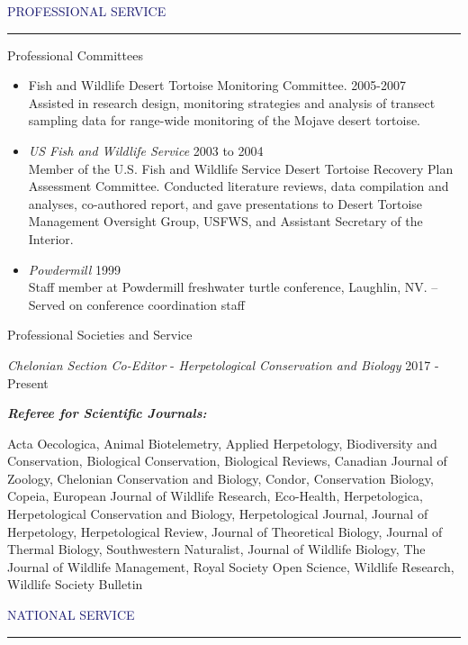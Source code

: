 \documentclass{resume} %
\renewenvironment{rSection}[1]{
\sectionskip
\textcolor{MidnightBlue}{\MakeUppercase{#1}}
\sectionlineskip
\hrule
\begin{list}{}{
\setlength{\leftmargin}{1.5em}
}
\item[]
}{
\end{list}
}
\begin{document}
\begin{rSection}{Professional Service}
\begin{rSubsection}{Professional Committees}{}{}{}
\begin{itemize}
\item Fish and Wildlife Desert Tortoise Monitoring Committee. \hfill 2005-2007\\
Assisted in research design, monitoring strategies and analysis of transect sampling data for range-wide monitoring of the Mojave desert tortoise.
\item \textit{US Fish and Wildlife Service} \hfill 2003 to 2004 \\
Member of the U.S. Fish and Wildlife Service Desert Tortoise Recovery Plan Assessment Committee. Conducted literature reviews, data compilation and analyses, co-authored report, and gave presentations to Desert Tortoise Management Oversight Group, USFWS, and Assistant Secretary of the Interior.
\item \textit{Powdermill} \hfill 1999 \\ 
Staff member at Powdermill freshwater turtle conference, Laughlin, NV. – Served on conference coordination staff

\end{itemize}

\end{rSubsection}

\begin{rSubsection}{Professional Societies and Service}{}{}{}

\item \textit{Chelonian Section Co-Editor} - \textit{Herpetological Conservation and Biology} \hfill 2017 - Present

\textbf{\textit{Referee for Scientific Journals:}}

Acta Oecologica, Animal Biotelemetry, Applied Herpetology, Biodiversity and Conservation, Biological Conservation, Biological Reviews, Canadian Journal of Zoology, Chelonian Conservation and Biology,
Condor, Conservation Biology, Copeia, European Journal of Wildlife Research, Eco-Health, Herpetologica, Herpetological Conservation and Biology, Herpetological Journal, Journal of Herpetology, Herpetological Review, Journal of Theoretical Biology, Journal of Thermal Biology, Southwestern Naturalist, Journal of Wildlife Biology, The Journal of Wildlife Management, Royal Society Open Science, Wildlife Research, Wildlife Society Bulletin 

\end{rSubsection}
\begin{rSection}{National Service}


\end{rSection}
\end{rSection}
\end{document}

